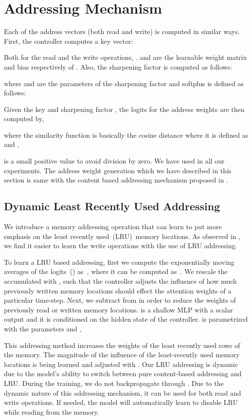 \documentclass[12pt]{article}
\begin{document}
\section{Addressing Mechanism}

Each of the address vectors (both read and write) is computed in similar
ways. First, the controller computes a key vector:

Both for the read and the write operations, .  and  are the learnable weight matrix and bias respectively of .  Also, the sharpening factor  is computed as follows:


where  and  are the parameters of the sharpening factor  and softplus is defined as follows:

Given the key  and sharpening factor , the logits for the address weights are then computed by,

where the similarity function is basically the cosine distance where it is defined as  and ,

 is a small positive value to avoid division by zero. We have used  in all our experiments. The address weight generation which we have described in this section is same with the content based addressing mechanism proposed in \citep{graves2014neural}. 


\subsection{Dynamic Least Recently Used Addressing}

We introduce a memory addressing operation that can learn to put more emphasis on the 
least recently used~(LRU)~memory locations. As observed in \citep{santoro2016one, dmnew},
we find it easier to learn the write operations with the use of LRU addressing.

To learn a LRU based addressing, first we compute the exponentially moving averages of the logits~() as~, where it can be computed as~. We rescale the accumulated  with , such that the controller adjusts the influence of how much previously written memory locations should effect the attention weights of a particular time-step. Next, we subtract  from  in order to reduce the weights of previously read or written memory locations.  is a shallow MLP with a scalar output and it is conditioned on the hidden state of the controller.  is parametrized with the parameters  and ,


This addressing method increases the weights of the least recently used rows of the memory. The magnitude of the influence of the least-recently used memory locations is being learned and adjusted with . Our LRU addressing is dynamic due to the model's ability to switch between pure content-based addressing and LRU. During the training, we do not backpropagate through . Due to the dynamic nature of this addressing mechanism, it can be used for both read and write operations. If needed, the model will automatically learn to disable LRU while reading from the memory.
\end{document}
